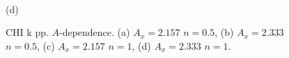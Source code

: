 \begin{figure}[h!]
\begin{minipage}[h]{0.5\linewidth}
\end{minipage}
\hfill
\begin{minipage}[h]{0.5\linewidth}
 \\(d)
\end{minipage}
\caption{CHI k pp. $A$-dependence. (a) $A_x=2.157$ $n=0.5$, (b) $A_x=2.333$ $n=0.5$, (c) $A_x=2.157$ $n=1$, (d) $A_x=2.333$ $n=1$.}
\label{fig:CHI_k_pp_A}
\end{figure}







